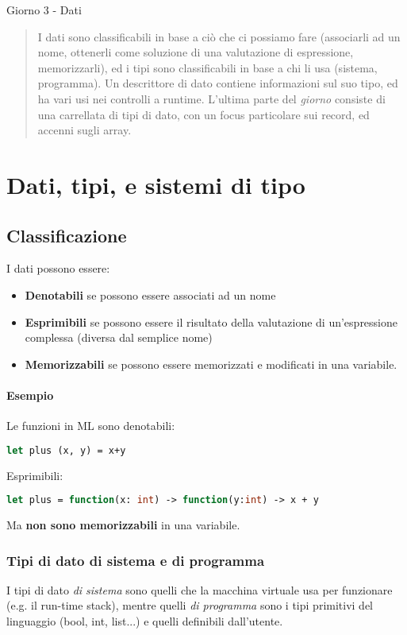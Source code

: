 \documentclass[a4paper,10pt]{article}
\begin{document}
\begin{center}
    \Large Giorno 3 - Dati\smallskip

\end{center}\smallskip
\begin{abstract}
 I dati sono classificabili in base a ciò che ci possiamo fare (associarli ad un nome, ottenerli come soluzione di una valutazione di espressione, memorizzarli), ed i tipi sono classificabili in base a chi li usa (sistema, programma). Un descrittore di dato contiene informazioni sul suo tipo, ed ha vari usi nei controlli a runtime. L'ultima parte del \emph{giorno} consiste di una carrellata di tipi di dato, con un focus particolare sui record, ed accenni sugli array.
\end{abstract}

\section{Dati, tipi, e sistemi di tipo}
\subsection{Classificazione}
I dati possono essere:
\begin{itemize}
 \item \textbf{Denotabili} se possono essere associati ad un nome
 \item \textbf{Esprimibili} se possono essere il risultato della valutazione di un'espressione complessa (diversa dal semplice nome)
 \item \textbf{Memorizzabili} se possono essere memorizzati e modificati in una variabile.
\end{itemize}

\paragraph{Esempio} Le funzioni in ML sono denotabili:
\begin{lstlisting}[language = ml]
let plus (x, y) = x+y
\end{lstlisting}
Esprimibili:
\begin{lstlisting}[language = ml]
let plus = function(x: int) -> function(y:int) -> x + y
\end{lstlisting}
Ma \textbf{non sono memorizzabili} in una variabile.

\subsubsection{Tipi di dato di sistema e di programma}
I tipi di dato \emph{di sistema} sono quelli che la macchina virtuale usa per funzionare (e.g. il run-time stack), mentre quelli \emph{di programma} sono i tipi primitivi del linguaggio (bool, int, list...) e quelli definibili dall'utente.
\end{document}
